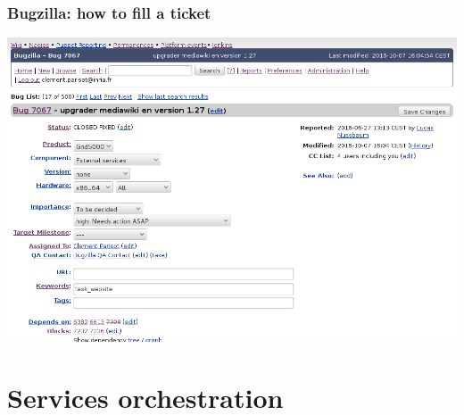 \documentclass[11pt,compress,final]{beamer}
\begin{document}
\begin{frame}
\frametitle{Bugzilla: how to fill a ticket}
  \includegraphics[scale=0.29]{figures/bugzilla_ticket}
\end{frame}

\section{Services orchestration}
\end{document}

